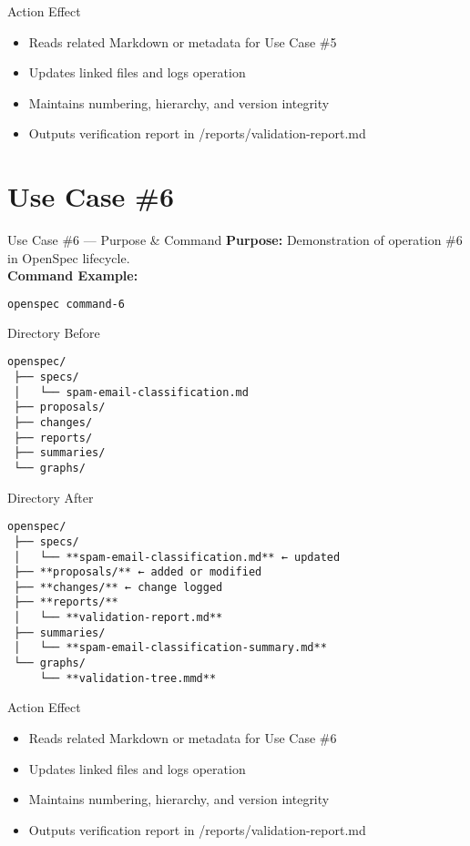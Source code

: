 \documentclass[aspectratio=169]{beamer}
\begin{document}
\begin{frame}{Action Effect}
\begin{itemize}
  \item Reads related Markdown or metadata for Use Case \#5
  \item Updates linked files and logs operation
  \item Maintains numbering, hierarchy, and version integrity
  \item Outputs verification report in /reports/validation-report.md
\end{itemize}
\end{frame}

\section*{Use Case \#6}
\begin{frame}{Use Case \#6 --- Purpose \& Command}
\textbf{Purpose:} Demonstration of operation \#6 in OpenSpec lifecycle.\\[4pt]
\textbf{Command Example:}
\begin{lstlisting}[language=bash]
openspec command-6
\end{lstlisting}
\end{frame}

\begin{frame}{Directory Before}
\begin{lstlisting}
openspec/
 ├── specs/
 │   └── spam-email-classification.md
 ├── proposals/
 ├── changes/
 ├── reports/
 ├── summaries/
 └── graphs/
\end{lstlisting}
\end{frame}

\begin{frame}{Directory After}
\begin{lstlisting}
openspec/
 ├── specs/
 │   └── **spam-email-classification.md** ← updated
 ├── **proposals/** ← added or modified
 ├── **changes/** ← change logged
 ├── **reports/**
 │   └── **validation-report.md**
 ├── summaries/
 │   └── **spam-email-classification-summary.md**
 └── graphs/
     └── **validation-tree.mmd**
\end{lstlisting}
\end{frame}

\begin{frame}{Action Effect}
\begin{itemize}
  \item Reads related Markdown or metadata for Use Case \#6
  \item Updates linked files and logs operation
  \item Maintains numbering, hierarchy, and version integrity
  \item Outputs verification report in /reports/validation-report.md
\end{itemize}
\end{frame}
\end{document}
